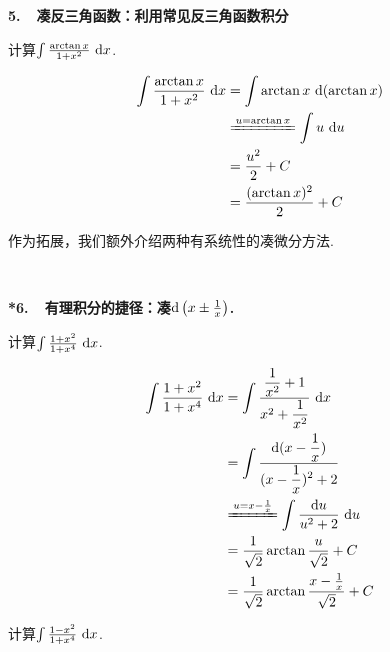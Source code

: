 \textbf{5.~~凑反三角函数：利用常见反三角函数积分}

\begin{example}
\label{ex:ch03-07}
计算$\int \frac{\arctan x}{1+x^2}~\mathrm{d} x$.
\end{example}

\begin{solution}
\begin{equation}
    \begin{aligned}
        \int \frac{\arctan x}{1+x^2}~\d x
        &= \int \arctan x ~\d(\arctan x) \\
        &\xlongequal{u=\arctan x} \int u ~\d u \\
        &= \frac{u^2}{2} +C \\
        &= \frac{(\arctan x)^2}{2} + C
        \nonumber
    \end{aligned}
\end{equation}
\end{solution}

\clearpage

作为拓展，我们额外介绍两种有系统性的凑微分方法.\par
~\par
\textbf{*6.~~有理积分的捷径：凑$\mathrm{d} \left(x \pm \frac{1}{x} \right)$.}

\begin{example}
\label{ex:ch03-08}
计算$\int \frac{1+x^2}{1+x^4} ~\mathrm{d} x$.
\end{example}

\begin{solution}
\begin{equation}
    \begin{aligned}
        \int \frac{1+x^2}{1+x^4} ~\d x
        &= \int \frac{\displaystyle\frac{1}{x^2}+1}{x^2+\displaystyle\frac{1}{x^2}}~\d x \\
        &= \int \frac{\d (x-\displaystyle\frac{1}{x})}{(x-\displaystyle\frac{1}{x})^2+2} \\
        &\xlongequal{u = x - \frac{1}{x}} \int \frac{\d u}{u^2 + 2}~\d u \\
        &= \frac{1}{\sqrt{2}}\arctan{\frac{u}{\sqrt{2}}} +C \\
        &= \frac{1}{\sqrt{2}}\arctan{\frac{x-\frac{1}{x}}{\sqrt{2}}} +C
        \nonumber
    \end{aligned}
\end{equation}
\end{solution}

\begin{example}
\label{ex:ch03-09}
计算$\int \frac{1-x^2}{1+x^4} ~ \mathrm{d} x $.
\end{example}

